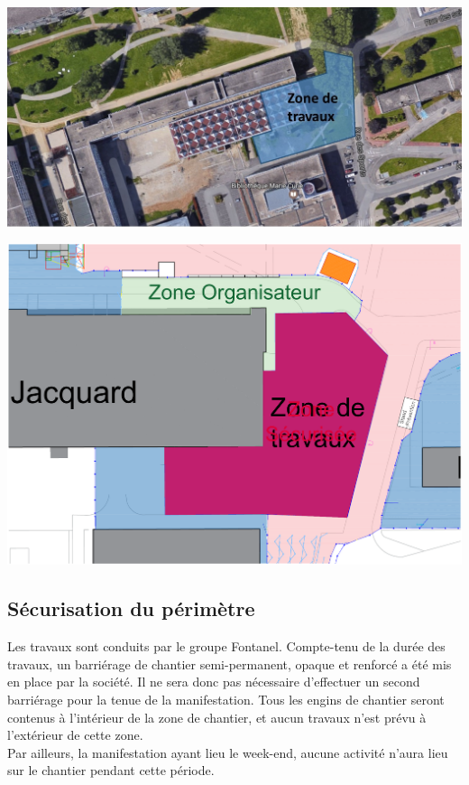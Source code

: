 \documentclass[hidelinks, paper=a4, fontsize=13pt]{report}
\begin{document}
\begin{center}
	\includegraphics[width=.8\textwidth,keepaspectratio]{Exports/Zone_travaux}
\end{center}

\begin{center}
	\includegraphics[width=.8\textwidth,keepaspectratio]{Exports/Plan_24h_44eme-Zone_de_travaux}
\end{center}

\subsection{Sécurisation du périmètre}
Les travaux sont conduits par le groupe Fontanel. Compte-tenu de la durée des travaux, un barriérage de chantier semi-permanent, opaque et renforcé a été mis en place par la société. Il ne sera donc pas nécessaire d'effectuer un second barriérage pour la tenue de la manifestation. Tous les engins de chantier seront contenus à l'intérieur de la zone de chantier, et aucun travaux n'est prévu à l'extérieur de cette zone.\\

Par ailleurs, la manifestation ayant lieu le week-end, aucune activité n'aura lieu sur le chantier pendant cette période.\\
\end{document}
